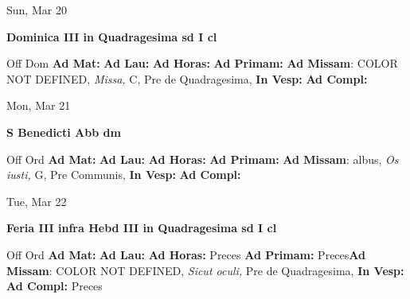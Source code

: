 \documentclass[10pt]{memoir}
\begin{document}
\begin{center}
\begin{minipage}{3.5in}
\vspace{2em}
\begin{center}Sun, Mar 20
\end{center}
\textbf{ \large Dominica III in Quadragesima
\textnormal{\normalsize sd I cl}}

\begin{justify}Off Dom
\textbf{Ad Mat: }
\textbf{Ad Lau: }
\textbf{Ad Horas: }
\textbf{Ad Primam: }\textbf{Ad Missam}: COLOR NOT DEFINED, \textit{Missa,} C, Pre de Quadragesima, 
\textbf{In Vesp: }
\textbf{Ad Compl: }
\end{justify}
\end{minipage}
\end{center}

\begin{center}
\begin{minipage}{3.5in}
\vspace{2em}
\begin{center}Mon, Mar 21
\end{center}
\textbf{ \large S Benedicti Abb
\textnormal{\normalsize dm}}

\begin{justify}Off Ord
\textbf{Ad Mat: }
\textbf{Ad Lau: }
\textbf{Ad Horas: }
\textbf{Ad Primam: }\textbf{Ad Missam}: albus, \textit{Os iusti,} G, Pre Communis, 
\textbf{In Vesp: }
\textbf{Ad Compl: }
\end{justify}
\end{minipage}
\end{center}

\begin{center}
\begin{minipage}{3.5in}
\vspace{2em}
\begin{center}Tue, Mar 22
\end{center}
\textbf{ \large Feria III infra Hebd III in Quadragesima
\textnormal{\normalsize sd I cl}}

\begin{justify}Off Ord
\textbf{Ad Mat: }
\textbf{Ad Lau: }
\textbf{Ad Horas: }Preces
\textbf{Ad Primam: }Preces\textbf{Ad Missam}: COLOR NOT DEFINED, \textit{Sicut oculi,} Pre de Quadragesima, 
\textbf{In Vesp: }
\textbf{Ad Compl: }Preces
\end{justify}
\end{minipage}
\end{center}
\end{document}
